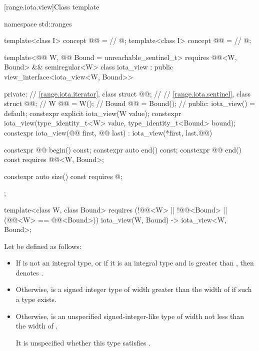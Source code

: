 [range.iota.view]{Class template }

%
\begin{codeblock}
namespace std::ranges {
  template<class I>
    concept @@ =     // \expos
      @\seebelow@;
  template<class I>
    concept @@ =       // \expos
      @\seebelow@;

  template<@@ W, @@ Bound = unreachable_sentinel_t>
    requires @@<W, Bound> && semiregular<W>
  class iota_view : public view_interface<iota_view<W, Bound>> {
  private:
    // \ref{range.iota.iterator}, class 
    struct @@;            // \expos
    // \ref{range.iota.sentinel}, class 
    struct @@;            // \expos
    W @@ = W();             // \expos
    Bound @@ = Bound();     // \expos
  public:
    iota_view() = default;
    constexpr explicit iota_view(W value);
    constexpr iota_view(type_identity_t<W> value,
                        type_identity_t<Bound> bound);
    constexpr iota_view(@@ first, @@ last) : iota_view(*first, last.@@) {}

    constexpr @@ begin() const;
    constexpr auto end() const;
    constexpr @@ end() const requires @@<W, Bound>;

    constexpr auto size() const requires @\seebelow@;
  };

  template<class W, class Bound>
    requires (!@@<W> || !@@<Bound> ||
              (@@<W> == @@<Bound>))
    iota_view(W, Bound) -> iota_view<W, Bound>;
}
\end{codeblock}

\pnum
Let  be defined as follows:
\begin{itemize}
\item
  If  is not an integral type, or
  if it is an integral type and 
  is greater than ,
  then  denotes .
\item
  Otherwise, 
  is a signed integer type of width greater than the width of 
  if such a type exists.
\item
  Otherwise, 
  is an unspecified signed-integer-like type
  of width not less than the width of .
  \begin{note}
  It is unspecified
  whether this type satisfies .
  \end{note}
\end{itemize}

